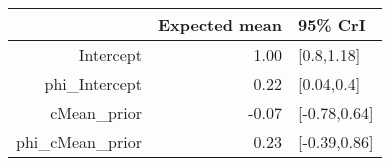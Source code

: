 \begin{tabular}{rrl}
  \hline
 & Expected mean & 95\% CrI \\ 
  \hline
Intercept & 1.00 & [0.8,1.18] \\ 
  phi\_Intercept & 0.22 & [0.04,0.4] \\ 
  cMean\_prior & -0.07 & [-0.78,0.64] \\ 
  phi\_cMean\_prior & 0.23 & [-0.39,0.86] \\ 
   \hline
\end{tabular}


